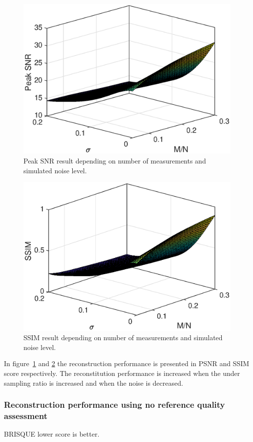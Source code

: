 \begin{figure}[H]
    \centering
    \includegraphics[width = 0.7\linewidth]{result/synt_sss/PSNR_fit.eps}
    \caption{Peak SNR result depending on number of measurements and simulated noise level.}
    \label{fig:psnr_3d}
\end{figure}

\begin{figure}[H]
    \centering
    \includegraphics[width = 0.7\linewidth]{result/synt_sss/SSIM_fit.eps}
    \caption{SSIM result depending on number of measurements and simulated noise level.}
    \label{fig:ssim_3d}
\end{figure}

In figure~\ref{fig:psnr_3d} and \ref{fig:ssim_3d} the reconstruction performance is presented in PSNR and SSIM score respectively. The reconstitution performance is increased when the under sampling ratio is increased and when the noise is decreased.  

\subsubsection{Reconstruction performance using no reference quality assessment}
BRISQUE lower score is better.

